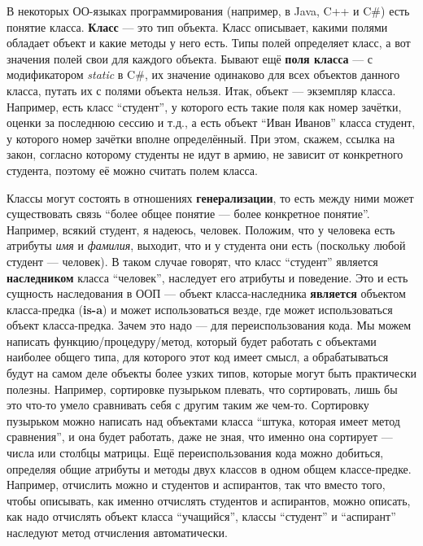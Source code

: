 \documentclass[a5paper]{article}
\begin{document}
В некоторых ОО-языках программирования (например, в Java, C++ и C\#) есть понятие класса. \textbf{Класс} --- это тип объекта. Класс описывает, какими полями обладает объект и какие методы у него есть. Типы полей определяет класс, а вот значения полей свои для каждого объекта. Бывают ещё \textbf{поля класса} --- с модификатором \textit{static} в C\#, их значение одинаково для всех объектов данного класса, путать их с полями объекта нельзя. Итак, объект --- экземпляр класса. Например, есть класс ``студент'', у которого есть такие поля как номер зачётки, оценки за последнюю сессию и т.д., а есть объект ``Иван Иванов'' класса студент, у которого номер зачётки вполне определённый. При этом, скажем, ссылка на закон, согласно которому студенты не идут в армию, не зависит от конкретного студента, поэтому её можно считать полем класса.

Классы могут состоять в отношениях \textbf{генерализации}, то есть между ними может существовать связь ``более общее понятие --- более конкретное понятие''. Например, всякий студент, я надеюсь, человек. Положим, что у человека есть атрибуты \textit{имя} и \textit{фамилия}, выходит, что и у студента они есть (поскольку любой студент --- человек). В таком случае говорят, что класс ``студент'' является \textbf{наследником} класса ``человек'', наследует его атрибуты и поведение. Это и есть сущность наследования в ООП --- объект класса-наследника \textbf{является} объектом класса-предка (\textbf{is-a}) и может использоваться везде, где может использоваться объект класса-предка. Зачем это надо --- для переиспользования кода. Мы можем написать функцию/процедуру/метод, который будет работать с объектами наиболее общего типа, для которого этот код имеет смысл, а обрабатываться будут на самом деле объекты более узких типов, которые могут быть практически полезны. Например, сортировке пузырьком плевать, что сортировать, лишь бы это что-то умело сравнивать себя с другим таким же чем-то. Сортировку пузырьком можно написать над объектами класса ``штука, которая имеет метод сравнения'', и она будет работать, даже не зная, что именно она сортирует --- числа или столбцы матрицы. Ещё переиспользования кода можно добиться, определяя общие атрибуты и методы двух классов в одном общем классе-предке. Например, отчислить можно и студентов и аспирантов, так что вместо того, чтобы описывать, как именно отчислять студентов и аспирантов, можно описать, как надо отчислять объект класса ``учащийся'', классы ``студент'' и ``аспирант'' наследуют метод отчисления автоматически. 
\end{document}
